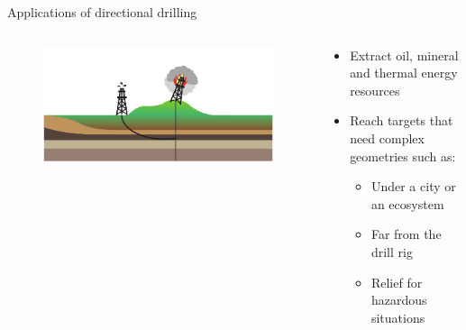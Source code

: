 \documentclass{beamer}
\begin{document}
\begin{frame}{Applications of directional drilling}
\begin{columns}
\begin{column}{0.4\textwidth}
\begin{figure}[t]
\begin{minipage}[t]{1\textwidth}
		\end{minipage}
		\begin{minipage}[t]{1\textwidth}
			\centering
			\includegraphics[width=1\linewidth]{images/appdd3.pdf}\\
		\end{minipage}
	\end{figure}
	\end{column}
	\begin{column}{0.6\textwidth}\setlength{\leftmargini}{20pt}
		\begin{itemize}\setlength\itemsep{2.5em}
			\item Extract oil, mineral and thermal energy resources
			\item Reach targets that need complex geometries such as:
				\begin{itemize}\setlength\itemsep{1em}
					\item Under a city or an ecosystem
					\item Far from the drill rig
					\item Relief for hazardous situations
				\end{itemize}
		\end{itemize}
	\end{column}
	\end{columns}
\end{frame}
\end{document}
